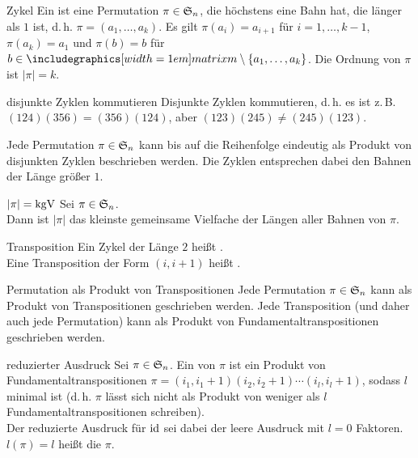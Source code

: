\begin{Def}{Zykel}
    Ein  ist eine Permutation $\pi \in \mathfrak{S}_n$,
    die höchstens eine Bahn hat, die länger als $1$ ist, d.\,h.
    $\pi = (a_1, \dotsc, a_k)$.
    Es gilt $\pi(a_i) = a_{i+1}$ für $i = 1, \dotsc, k - 1$,
    $\pi(a_k) = a_1$ und $\pi(b) = b$ für
    $b \in \matrixm \setminus \{a_1, \dotsc, a_k\}$.
    Die Ordnung von $\pi$ ist $|\pi| = k$.
\end{Def}

\begin{Lemma}{disjunkte Zyklen kommutieren}
    Disjunkte Zyklen kommutieren, d.\,h. es ist z.\,B. \\
    $(124)(356) = (356)(124)$, aber
    $(123)(245) \not= (245)(123)$.
\end{Lemma}

\begin{Kor}
    Jede Permutation $\pi \in \mathfrak{S}_n$ kann bis auf die Reihenfolge eindeutig
    als Produkt von disjunkten Zyklen beschrieben werden.
    Die Zyklen entsprechen dabei den Bahnen der Länge größer $1$.
\end{Kor}

\begin{Satz}{$|\pi| = \operatorname{kgV}$}
    Sei $\pi \in \mathfrak{S}_n$. \\
    Dann ist $|\pi|$ das kleinste gemeinsame Vielfache der Längen aller
    Bahnen von $\pi$.
\end{Satz}

\begin{Def}{Transposition}
    Ein Zykel der Länge $2$ heißt . \\
    Eine Transposition der Form $(i, i + 1)$ heißt
    .
\end{Def}

\begin{Satz}{Permutation als Produkt von Transpositionen}
    Jede Permutation $\pi \in \mathfrak{S}_n$ kann als Produkt von Transpositionen
    geschrieben werden.
    Jede Transposition (und daher auch jede Permutation)
    kann als Produkt von Fundamentaltranspositionen geschrieben werden.
\end{Satz}

\begin{Def}{reduzierter Ausdruck}
    Sei $\pi \in \mathfrak{S}_n$.
    Ein  von $\pi$ ist ein Produkt von
    Fundamentaltranspositionen
    $\pi = (i_1, i_1 + 1)(i_2, i_2 + 1) \dotsm (i_l, i_l + 1)$, sodass
    $l$ minimal ist
    (d.\,h. $\pi$ lässt sich nicht als Produkt von weniger als $l$
    Fundamentaltranspositionen schreiben). \\
    Der reduzierte Ausdruck für $\operatorname{id}$ sei dabei der leere Ausdruck mit
    $l = 0$ Faktoren. \\
    $l(\pi) = l$ heißt die  $\pi$.
\end{Def}

